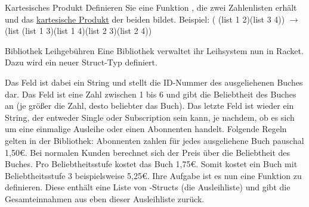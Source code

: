 \documentclass{../preamble}
\begin{document}
\begin{task}[credit = \stars{2}{3}]{Kartesisches Produkt}
    Definieren Sie eine Funktion , die zwei Zahlenlisten erhält und das \href{https://de.wikipedia.org/wiki/Kartesisches_Produkt}{kartesische Produkt} der beiden bildet. Beispiel:
    \newline
    ( (\textcolor{keywordcolor}{list} 1 2)(\textcolor{keywordcolor}{list} 3 4)) \(\rightarrow\) (\textcolor{keywordcolor}{list} (\textcolor{keywordcolor}{list} 1 3)(\textcolor{keywordcolor}{list} 1 4)(\textcolor{keywordcolor}{list} 2 3)(\textcolor{keywordcolor}{list} 2 4))

    \begin{solution}
        
    \end{solution}
\end{task}

\clearpage

\begin{task}[credit = \stars{3}{3}]{Bibliothek Leihgebühren}
    Eine Bibliothek verwaltet ihr Leihsystem nun in Racket. Dazu wird ein neuer Struct-Typ  definiert.
    
    Das Feld  ist dabei ein String und stellt die ID-Nummer des ausgeliehenen Buches dar. Das Feld  ist eine Zahl zwischen 1 bis 6 und gibt die Beliebtheit des Buches an (je größer die Zahl, desto beliebter das Buch). Das letzte Feld  ist wieder ein String, der entweder \grqq Single\grqq{} oder \grqq Subscription\grqq{} sein kann, je nachdem, ob es sich um eine einmalige Ausleihe oder einen Abonnenten handelt.
    \br
    Folgende Regeln gelten in der Bibliothek: Abonnenten zahlen für jedes ausgeliehene Buch pauschal 1,50€. Bei normalen Kunden berechnet sich der Preis über die Beliebtheit des Buches. Pro Beliebtheitsstufe kostet das Buch 1,75€. Somit kostet ein Buch mit Beliebtheitsstufe 3 beispielsweise 5,25€.
    \br
    Ihre Aufgabe ist es nun eine Funktion  zu definieren. Diese enthält eine Liste von -Structs (die Ausleihliste) und gibt die Gesamteinnahmen aus eben dieser Ausleihliste zurück.

    \begin{solution}
        
    \end{solution}
\end{task}

\clearpage
\end{document}
